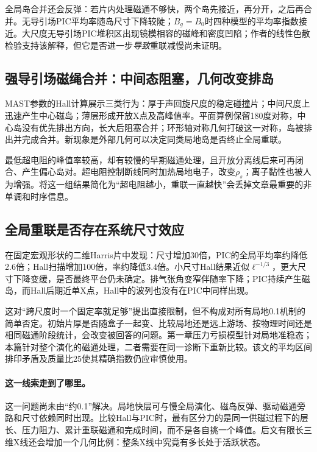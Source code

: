 全局岛合并还会反弹：若片内处理磁通不够快，两个岛先接近，再分开，之后再合并。无导引场PIC平均率随岛尺寸下降较陡；$B_g=B_0$时四种模型的平均率指数接近。大尺度无导引场PIC堆积区出现镜模相容的磁峰和密度凹陷；作者的线性色散检验支持该解释，但它是否进一步\emph{导致}重联减慢尚未证明。

\subsection{强导引场磁绳合并：中间态阻塞，几何改变排岛}
MAST参数的Hall计算展示三类行为：厚于声回旋尺度的稳定碰撞片；中间尺度上迅速产生中心磁岛；薄层形成开放X点及高峰值率。平面算例保留180度对称，中心岛没有优先排出方向，长大后阻塞合并；环形轴对称几何打破这一对称，岛被排出并完成合并。新现象是外部几何可以决定同类局地岛是否终止全局重联。\citep{Stanier2013}

最低超电阻的峰值率较高，却有较慢的早期磁通处理，且开放分离线后来可再闭合、产生偏心岛对。超电阻控制断线同时加热局地电子，改变$\rho_s$；离子黏性也被人为增强。将这一组结果简化为“超电阻越小，重联一直越快”会丢掉文章最重要的非单调和时序信息。

\subsection{全局重联是否存在系统尺寸效应}
\citet{F600}在固定宏观形状的二维Harris片中发现：尺寸增加30倍，PIC的全局平均率约降低2.6倍；Hall扫描增加100倍，率约降低3.4倍。小尺寸Hall结果近似$\ell^{-1/3}$，更大尺寸下降变缓，是否最终平台仍未确定。排气张角变窄伴随率下降；PIC持续产生磁岛，而Hall后期近单X点，Hall中的波列也没有在PIC中同样出现。

这对“跨尺度时一个固定率就足够”提出直接限制，但不构成对所有局地0.1机制的简单否定。初始片厚是否随盒子一起变、比较局地还是远上游场、按物理时间还是相同磁通阶段统计，会改变被回答的问题。第一章压力亏损模型针对局地准稳态；本篇针对整个演化的磁通处理，二者需要在同一诊断下重新比较。该文的平均区间排印矛盾及质量比25使其精确指数仍应审慎使用。

\paragraph{这一线索走到了哪里。}这一问题尚未由“约0.1”解决。局地快层可与慢全局演化、磁岛反弹、驱动磁通旁路和尺寸依赖同时出现。比较Hall与PIC时，最有区分力的是同一供磁过程下的层长、压力阻力、累计重联磁通和完成时间，而不是各自挑一个峰值。后文有限长三维X线还会增加一个几何比例：整条X线中究竟有多长处于活跃状态。

